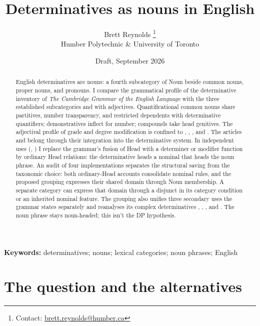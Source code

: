 \documentclass[12pt]{article}
\title{Determinatives as nouns in English}
\author{Brett Reynolds \orcidlink{0000-0003-0073-7195}%
\thanks{Contact: \href{mailto:brett.reynolds@humber.ca}{brett.reynolds@humber.ca}}\\
Humber Polytechnic \& University of Toronto}
\date{Draft, September 2026}
\begin{document}
\maketitle

\begin{abstract}
English determinatives are nouns: a fourth subcategory of Noun beside common nouns, proper nouns, and pronouns. I compare the grammatical profile of the determinative inventory of \textit{The Cambridge Grammar of the English Language} with the three established subcategories and with adjectives. Quantificational common nouns share partitives, number transparency, and restricted dependents with determinative quantifiers; demonstratives inflect for number; compounds take head genitives. The adjectival profile of grade and degree modification is confined to , , , and . The articles and  belong through their integration into the determinative system. In independent uses (, ) I replace the grammar's fusion of Head with a determiner or modifier function by ordinary Head relations: the determinative heads a nominal that heads the noun phrase. An audit of four implementations separates the structural saving from the taxonomic choice: both ordinary-Head accounts consolidate nominal rules, and the proposed grouping expresses their shared domain through Noun membership. A separate category can express that domain through a disjunct in its category condition or an inherited nominal feature. The grouping also unifies three secondary uses the grammar states separately and reanalyses its complex determinatives , , , and . The noun phrase stays noun-headed; this isn't the DP hypothesis.
\end{abstract}

\noindent\textbf{Keywords:} determinatives; nouns; lexical categories; noun phrases; English

\par\medskip
{}
\medskip

\section{The question and the alternatives}\label{sec:intro}
\end{document}
